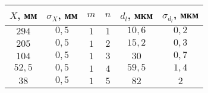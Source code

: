 \begin{tabular}{| c | c | c | c | c | c |}
\hline
$X$, мм & $\sigma_X$, мм & $m$ & $n$ & $d_l$, мкм & $\sigma_{d_l}$, мкм\\
\hline
$294$ & $0,5$ & $1$ & $1$ & $10,6$ & $0,2$\\
\hline
$205$ & $0,5$ & $1$ & $2$ & $15,2$ & $0,3$\\
\hline
$104$ & $0,5$ & $1$ & $3$ & $30$ & $0,7$\\
\hline
$52,5$ & $0,5$ & $1$ & $4$ & $59,5$ & $1,4$\\
\hline
$38$ & $0,5$ & $1$ & $5$ & $82$ & $2$\\
\hline
\end{tabular}
